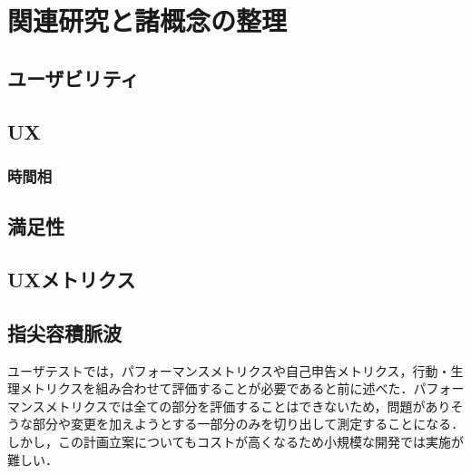 \chapter{関連研究と諸概念の整理}
\label{chap:prevresearch}

\section{ユーザビリティ}

\section{UX}

\subsection{時間相}

\section{満足性}

\section{UXメトリクス}

\section{指尖容積脈波}

ユーザテストでは，パフォーマンスメトリクスや自己申告メトリクス，行動・生理メトリクスを組み合わせて評価することが必要であると前に述べた．パフォーマンスメトリクスでは全ての部分を評価することはできないため，問題がありそうな部分や変更を加えようとする一部分のみを切り出して測定することになる．しかし，この計画立案についてもコストが高くなるため小規模な開発では実施が難しい．